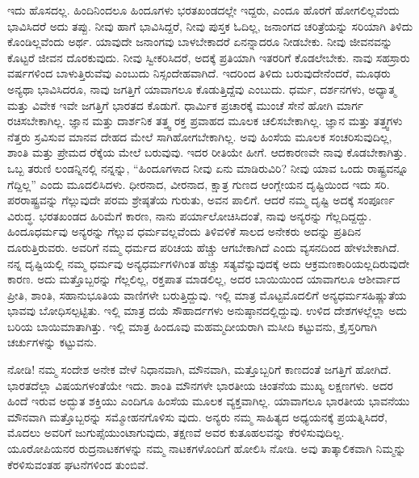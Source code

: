 ಇದು ಹೊಸದಲ್ಲ. ಹಿಂದಿನಿಂದಲೂ ಹಿಂದೂಗಳು ಭರತಖಂಡದಲ್ಲೇ ಇದ್ದರು, ಎಂದೂ ಹೊರಗೆ ಹೋಗಲಿಲ್ಲವೆಂದು ಭಾವಿಸಿದರೆ ಅದು ತಪ್ಪು. ನೀವು ಹಾಗೆ ಭಾವಿಸಿದ್ದರೆ, ನೀವು ಪುಸ್ತಕ ಓದಿಲ್ಲ, ಜನಾಂಗದ ಚರಿತ್ರೆಯನ್ನು ಸರಿಯಾಗಿ ತಿಳಿದು ಕೊಂಡಿಲ್ಲವೆಂದು ಅರ್ಥ. ಯಾವುದೇ ಜನಾಂಗವು ಬಾಳಬೇಕಾದರೆ ಏನನ್ನಾದರೂ ನೀಡಬೇಕು. ನೀವು ಜೀವನವನ್ನು ಕೊಟ್ಟರೆ ಜೀವನ ದೊರಕುವುದು. ನೀವು ಸ್ವೀಕರಿಸಿದರೆ, ಅದಕ್ಕೆ ಪ್ರತಿಯಾಗಿ ಇತರರಿಗೆ ಕೊಡಲೇಬೇಕು. ನಾವು ಸಹಸ್ರಾರು ವರ್ಷಗಳಿಂದ ಬಾಳುತ್ತಿರುವೆವು ಎಂಬುದು ನಿಸ್ಸಂದೇಹವಾಗಿದೆ. ಇದರಿಂದ ತಿಳಿದು ಬರುವುದೇನೆಂದರೆ, ಮೂಢರು ಅನ್ಯಥಾ ಭಾವಿಸಿದರೂ, ನಾವು ಜಗತ್ತಿಗೆ ಯಾವಾಗಲೂ ಕೊಡುತ್ತಿದ್ದೆವು ಎಂಬುದು. ಧರ್ಮ, ದರ್ಶನಗಳು, ಅಧ್ಯಾತ್ಮ ಮತ್ತು ವಿವೇಕ ಇವೇ ಜಗತ್ತಿಗೆ ಭಾರತದ ಕೊಡುಗೆ. ಧಾರ್ಮಿಕ ಪ್ರಚಾರಕ್ಕೆ ಮುಂಚೆ ಸೇನೆ ಹೋಗಿ ಮಾರ್ಗ ರಚಿಸಬೇಕಾಗಿಲ್ಲ. ಜ್ಞಾನ ಮತ್ತು ದಾರ್ಶನಿಕ ತತ್ತ್ವ ರಕ್ತ ಪ್ರವಾಹದ ಮೂಲಕ ಚಲಿಸಬೇಕಾಗಿಲ್ಲ. ಜ್ಞಾನ ಮತ್ತು ತತ್ತ್ವಗಳು ನೆತ್ತರು ಸ್ರವಿಸುವ ಮಾನವ ದೇಹದ ಮೇಲೆ ಸಾಗಿಹೋಗಬೇಕಾಗಿಲ್ಲ. ಅವು ಹಿಂಸೆಯ ಮೂಲಕ ಸಂಚರಿಸುವುದಿಲ್ಲ, ಶಾಂತಿ ಮತ್ತು ಪ್ರೇಮದ ರೆಕ್ಕೆಯ ಮೇಲೆ ಬರುವುವು. ಇದರ ರೀತಿಯೇ ಹೀಗೆ. ಆದಕಾರಣವೇ ನಾವು ಕೊಡಬೇಕಾಗಿತ್ತು. ಒಬ್ಬ ತರುಣಿ ಲಂಡನ್ನಿನಲ್ಲಿ ನನ್ನನ್ನು, “ಹಿಂದೂಗಳಾದ ನೀವು ಏನು ಮಾಡಿರುವಿರಿ? ನೀವು ಯಾವ ಒಂದು ರಾಷ್ಟ್ರವನ್ನೂ ಗೆದ್ದಿಲ್ಲ” ಎಂದು ಮೂದಲಿಸಿದಳು. ಧೀರನಾದ, ವೀರನಾದ, ಕ್ಷಾತ್ರ ಗುಣದ ಆಂಗ್ಲೇಯನ ದೃಷ್ಟಿಯಿಂದ ಇದು ಸರಿ. ಪರರಾಷ್ಟ್ರವನ್ನು ಗೆಲ್ಲುವುದೇ ಪರಮ ಶ್ರೇಷ್ಠತೆಯ ಗುರುತು, ಅವನ ಪಾಲಿಗೆ. ಆದರೆ ನಮ್ಮ ದೃಷ್ಟಿ ಅದಕ್ಕೆ ಸಂಪೂರ್ಣ ವಿರುದ್ಧ. ಭರತಖಂಡದ ಹಿರಿಮೆಗೆ ಕಾರಣ, ನಾನು ಪರ್ಯಾಲೋಚಿಸಿದಂತೆ, ನಾವು ಅನ್ಯರನ್ನು ಗೆಲ್ಲದಿದ್ದದ್ದು. ಹಿಂದೂಧರ್ಮವು ಅನ್ಯರನ್ನು ಗೆಲ್ಲುವ ಧರ್ಮವಲ್ಲವೆಂದು ತಿಳಿವಳಿಕೆ ಸಾಲದ ಅನೇಕರು ಅದನ್ನು ಪ್ರತಿದಿನ ದೂರುತ್ತಿರುವರು. ಅವರಿಗೆ ನಮ್ಮ ಧರ್ಮದ ಪರಿಚಯ ಹೆಚ್ಚು ಆಗಬೇಕಾಗಿದೆ ಎಂದು ವ್ಯಸನದಿಂದ ಹೇಳಬೇಕಾಗಿದೆ. ನನ್ನ ದೃಷ್ಟಿಯಲ್ಲಿ ನಮ್ಮ ಧರ್ಮವು ಅನ್ಯಧರ್ಮಗಳಿಗಿಂತ ಹೆಚ್ಚು ಸತ್ಯವೆನ್ನುವುದಕ್ಕೆ ಅದು ಆಕ್ರಮಣಕಾರಿಯಲ್ಲದಿರುವುದೇ ಕಾರಣ. ಅದು ಮತ್ತೊಬ್ಬರನ್ನು ಗೆಲ್ಲಲಿಲ್ಲ, ರಕ್ತಪಾತ ಮಾಡಲಿಲ್ಲ, ಅದರ ಬಾಯಿಯಿಂದ ಯಾವಾಗಲೂ ಆಶೀರ್ವಾದ ಪ್ರೀತಿ, ಶಾಂತಿ, ಸಹಾನುಭೂತಿಯ ವಾಣಿಗಳೇ ಬರುತ್ತಿದ್ದುವು. ಇಲ್ಲಿ ಮಾತ್ರ ಮೊಟ್ಟಮೊದಲಿಗೆ ಅನ್ಯಧರ್ಮಸಹಿಷ್ಣುತೆಯ ಭಾವವು ಬೋಧಿಸಲ್ಪಟ್ಟಿತು. ಇಲ್ಲಿ ಮಾತ್ರ ದಯೆ ಸೌಹಾರ್ದಗಳು ಅನುಷ್ಠಾನದಲ್ಲಿದ್ದುವು. ಉಳಿದ ದೇಶಗಳಲ್ಲೆಲ್ಲಾ ಅದು ಬರಿಯ ಬಾಯಿಮಾತಾಗಿತ್ತು. ಇಲ್ಲಿ ಮಾತ್ರ ಹಿಂದೂವು ಮಹಮ್ಮದೀಯರಾಗಿ ಮಸೀದಿ ಕಟ್ಟುವನು, ಕ್ರೈಸ್ತರಿಗಾಗಿ ಚರ್ಚುಗಳನ್ನು ಕಟ್ಟುವನು.

\vskip   4pt

ನೋಡಿ! ನಮ್ಮ ಸಂದೇಶ ಅನೇಕ ವೇಳೆ ನಿಧಾನವಾಗಿ, ಮೌನವಾಗಿ, ಮತ್ತೊಬ್ಬರಿಗೆ ಕಾಣದಂತೆ ಜಗತ್ತಿಗೆ ಹೋಗಿದೆ. ಭಾರತದೆಲ್ಲಾ ವಿಷಯಗಳಂತೆಯೇ ಇದು. ಶಾಂತಿ ಮೌನಗಳೇ ಭಾರತೀಯ ಚಿಂತನೆಯ ಮುಖ್ಯ ಲಕ್ಷಣಗಳು. ಅದರ ಹಿಂದೆ ಇರುವ ಅದ್ಭುತ ಶಕ್ತಿಯು ಎಂದಿಗೂ ಹಿಂಸೆಯ ಮೂಲಕ ವ್ಯಕ್ತವಾಗಿಲ್ಲ. ಯಾವಾಗಲೂ ಭಾರತೀಯ ಭಾವನೆಯು ಮೌನವಾಗಿ ಮತ್ತೊಬ್ಬರನ್ನು ಸಮ್ಮೋಹನಗೊಳಿಸು ವುದು. ಅನ್ಯರು ನಮ್ಮ ಸಾಹಿತ್ಯದ ಅಧ್ಯಯನಕ್ಕೆ ಪ್ರಯತ್ನಿಸಿದರೆ, ಮೊದಲು ಅವರಿಗೆ ಜುಗುಪ್ಸೆಯುಂಟಾಗುವುದು, ತಕ್ಷಣವೆ ಅವರ ಕುತೂಹಲವನ್ನು ಕೆರಳಿಸುವುದಿಲ್ಲ. ಯೂರೋಪಿಯನರ ರುದ್ರನಾಟಕಗಳನ್ನು ನಮ್ಮ ನಾಟಕಗಳೊಂದಿಗೆ ಹೋಲಿಸಿ ನೋಡಿ. ಅವು ತಾತ್ಕಾಲಿಕವಾಗಿ ನಿಮ್ಮನ್ನು ಕೆರಳಿಸುವಂತಹ ಘಟನೆಗಳಿಂದ ತುಂಬಿವೆ.

\newpage

